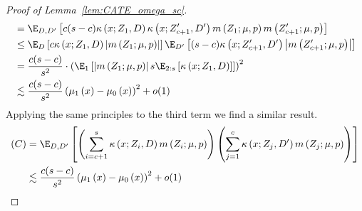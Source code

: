 \begin{proof}[Proof of Lemma~\ref{lem:CATE_omega_sc}]
\begin{equation}
\begin{aligned}
			& = \E_{D, D^{\prime}}\left[c (s-c) \kappa\left(x; Z_{1}, D\right)\kappa\left(x; Z_{c+1}^{\prime}, D^{\prime}\right) m\left(Z_{1}; \mu, p\right) m\left(Z_{c+1}^{\prime}; \mu, p\right)\right]\\
			& \leq \E_{D}\left[c \kappa\left(x; Z_{1}, D\right)  \left|m\left(Z_{1}; \mu, p\right)\right|\right]
			\E_{D^{\prime}}\left[(s-c) \kappa\left(x; Z_{c+1}^{\prime}, D^{\prime}\right)  \left| m\left(Z_{c+1}^{\prime}; \mu, p\right) \right|\right]\\
			& = \frac{c(s-c)}{s^2} \cdot \left(\E_{1}\left[\left|m\left(Z_{1}; \mu, p\right)\right| s \E_{2:s}\left[\kappa\left(x; Z_{1}, D\right)\right]\right]\right)^2\\
			& \lesssim \frac{c(s-c)}{s^2}\left(\mu_{1}\left(x\right) - \mu_{0}\left(x\right)\right)^2  + o(1)
		\end{aligned}
	\end{equation}
	Applying the same principles to the third term we find a similar result.
	\begin{equation}
		\begin{aligned}
			(C)
			& = \E_{D, D^{\prime}}\left[\left(\sum_{i = c + 1}^{s} \kappa\left(x; Z_{i}, D\right) m\left(Z_{i}; \mu, p\right)\right)
            \left(\sum_{j = 1}^{c} \kappa\left(x; Z_{j}, D^{\prime}\right) m\left(Z_{j}; \mu, p\right)\right)\right]\\
			& \lesssim \frac{c(s-c)}{s^2}\left(\mu_{1}\left(x\right) - \mu_{0}\left(x\right)\right)^2  + o(1)
		\end{aligned}

\end{equation}
\end{proof}
